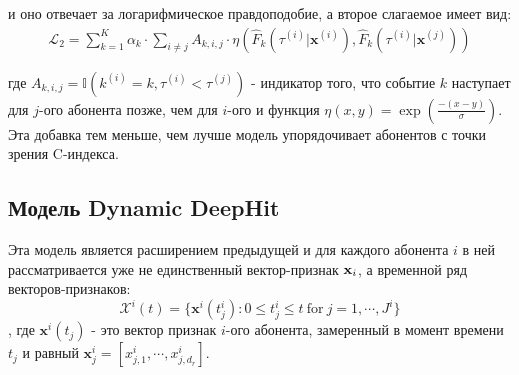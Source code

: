 \documentclass{article}
\begin{document}
и оно отвечает за логарифмическое правдоподобие, а второе слагаемое имеет вид: 
\begin{equation}
	\begin{aligned}
\mathcal{L}_2=\sum_{k=1}^K\alpha_k\cdot\sum_{i\neq j}A_{k,i,j}\cdot\eta\left(\hat{F}_k(\tau^{(i)}|\mathbf{x}^{(i)}),\hat{F}_k(\tau^{(i)}|\mathbf{x}^{(j)})\right)
	\end{aligned}
\end{equation}

где $A_{k,i,j} = \mathbb{I}(k^{(i)}=k,\tau^{(i)}<\tau^{(j)})$ - индикатор того, что событие $k$ наступает для $j$-ого абонента позже, чем для $i$-ого и функция
$\eta(x,y)=\exp\left(\frac{-(x-y)}{\sigma}\right)$. Эта добавка тем меньше, чем лучше модель упорядочивает абонентов с точки зрения C-индекса. 



\subsection{Модель Dynamic DeepHit}

Эта модель является расширением предыдущей и для каждого абонента $i$ в ней рассматривается уже не единственный вектор-признак $\bold{x}_i$, а временной ряд векторов-признаков: 
$$\mathcal{X}^i(t)=\{\mathbf{x}^i(t_j^i):0\leq t_j^i\leq t\mathrm{~for~}j=1,\cdots,J^i\}$$, где $\mathbf{x}^i(t_j)$ - это вектор признак $i$-ого абонента, замеренный в момент времени $t_j$ и равный $\mathbf{x}_j^i=[x_{j,1}^{i},\cdots,x_{j,d_{r}}^{i}]$.





\nocite{*}

\end{document}
